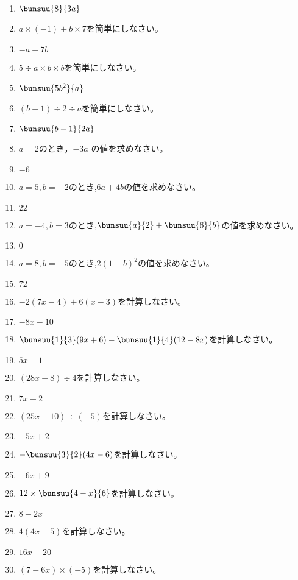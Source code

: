 \documentclass[uplatex,a4j,11pt]{jsreport}
\begin{document}
\begin{multicols}{2}
\begin{enumerate}
    \item $\bunsuu{8}{3a}$
    \item $a\times (-1)+b\times 7$\quad を簡単にしなさい。%
    \item $-a+7b$
    \item $5\div a\times b\times b$\quad を簡単にしなさい。%
    \item $\bunsuu{5b^2}{a}$
    \item $(b-1)\div 2\div a$\quad を簡単にしなさい。%
    \item $\bunsuu{b-1}{2a}$
    \item $a=2$のとき，$-3a$ の値を求めなさい。%
    \item $-6$
    \item $a=5, b=-2$のとき,\quad$6a+4b$\quad の値を求めなさい。%
    \item $22$
    \item $a=-4, b=3$のとき,\quad$\bunsuu{a}{2}+\bunsuu{6}{b}$\quad の値を求めなさい。%
    \item $0$
    \item $a=8, b=-5$のとき,\quad$2(1-b)^2$\quad の値を求めなさい。%
    \item $72$
    \item $-2(7x-4)+6(x-3)$\quad を計算しなさい。%
    \item $-8x-10$
    \item $\bunsuu{1}{3}(9x+6)-\bunsuu{1}{4}(12-8x)$\quad を計算しなさい。%
    \item $5x-1$
    \item $(28x-8)\div 4$\quad を計算しなさい。%
    \item $7x-2$
    \item $(25x-10)\div (-5)$\quad を計算しなさい。%
    \item $-5x+2$
    \item $-\bunsuu{3}{2}(4x-6)$\quad を計算しなさい。%
    \item $-6x+9$
    \item $12\times \bunsuu{4-x}{6}$\quad を計算しなさい。%
    \item $8-2x$
    \item $4(4x-5)$\quad を計算しなさい。%
    \item $16x-20$
    \item $(7-6x)\times (-5)$\quad を計算しなさい。%

\end{enumerate}
\end{multicols}
\end{document}

